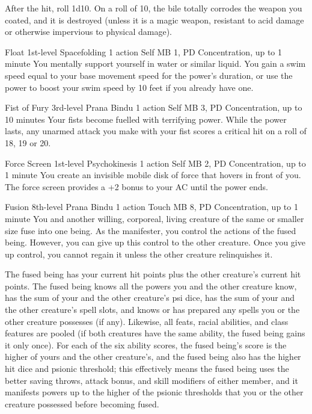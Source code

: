 After the hit, roll 1d10.
On a roll of 10,
the bile totally corrodes the weapon you coated,
and it is destroyed
(unless it is a magic weapon, resistant to acid damage
or otherwise impervious to physical damage).

\DndPowerHeader%
  {Float}
  {1st-level Spacefolding}
  {1 action}
  {Self}
  {MB 1, PD \lvlone}
  {Concentration, up to 1 minute}
You mentally support yourself in water or similar liquid.
You gain a swim speed equal to your base movement speed for
the power's duration,
or use the power to boost your swim speed by 10 feet
if you already have one.

\DndPowerHeader%
  {Fist of Fury}
  {3rd-level Prana Bindu}
  {1 action}
  {Self}
  {MB 3, PD \lvlthree}
  {Concentration, up to 10 minutes}
Your fists become fuelled with terrifying power.
While the power lasts,
any unarmed attack you make with your fist
scores a critical hit on a roll of
18, 19 or 20.

\DndPowerHeader%
  {Force Screen}
  {1st-level Psychokinesis}
  {1 action}
  {Self}
  {MB 2, PD \lvlone}
  {Concentration, up to 1 minute}
You create an invisible mobile disk of force that hovers in front of you.
The force screen provides a +2 bonus to your AC until the power ends.

\DndPowerHeader%
  {Fusion}
  {8th-level Prana Bindu}
  {1 action}
  {Touch}
  {MB 8, PD \lvleight}
  {Concentration, up to 1 minute}
  You and another willing, corporeal, living creature
  of the same or smaller size fuse into one being.
  As the manifester,
  you control the actions of the fused being.
  However, you can give up this control to the other creature.
  Once you give up control,
  you cannot regain it unless the other creature relinquishes it.

  The fused being has your current hit points
  plus the other creature's current hit points.
  The fused being knows all the powers you
  and the other creature know,
  has the sum of your and the other creature's psi dice,
  has the sum of your and the other creature's spell slots,
  and knows or has prepared any spells you or the other creature possesses
  (if any).
  Likewise, all feats, racial abilities, and class features
  are pooled
  (if both creatures have the same ability,
  the fused being gains it only once).
  For each of the six ability scores,
  the fused being's score is the higher of yours
  and the other creature's,
  and the fused being also has the higher hit dice
  and psionic threshold;
  this effectively means the fused being uses
  the better saving throws,
  attack bonus,
  and skill modifiers of either member,
  and it manifests powers up to the higher of the psionic thresholds
  that you or the other creature possessed before becoming fused.
  
